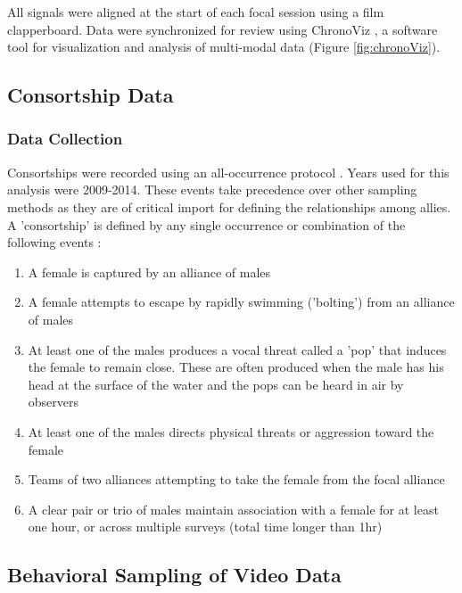 \documentclass[11pt]{amsart}
\begin{document}
\noindent All signals were aligned at the start of each focal session using a film clapperboard. Data were synchronized for review using ChronoViz \citep{fouse:2011}, a software tool for visualization and analysis of multi-modal data (Figure \ref{fig:chronoViz}). 

\subsection{Consortship Data}
\subsubsection{Data Collection}
Consortships were recorded using an all-occurrence protocol \citep{altmann:1974}. Years used for this analysis were 2009-2014. These events take precedence over other sampling methods as they are of critical import for defining the relationships among allies. A 'consortship' is defined by any single occurrence or combination of the following events \citep{connor:1996a}: 

\begin{enumerate}
\item A female is captured by an alliance of males
\item A female attempts to escape by rapidly swimming ('bolting') from an alliance of males
\item At least one of the males produces a vocal threat called a 'pop' that induces the female to remain close. These are often produced when the male has his head at the surface of the water and the pops can be heard in air by observers \citep{connor:1996b}
\item At least one of the males directs physical threats or aggression toward the female
\item Teams of two alliances attempting to take the female from the focal alliance \citep{connor:1992a, connor:1992b}
\item A clear pair or trio of males maintain association with a female for at least one hour, or across multiple surveys (total time longer than 1hr) %
\end{enumerate}

\subsection{Behavioral Sampling of Video Data}
\end{document}
